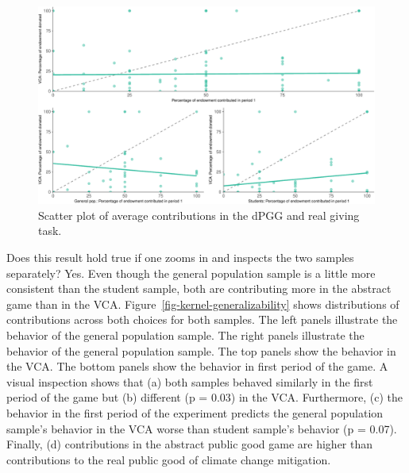 \documentclass[
  authoryear,
  preprint,
  3p]{elsarticle}
\begin{document}
\begin{figure}

{\centering \includegraphics{paper_files/figure-pdf/fig-scatter-generalizability-1.pdf}

}

\caption{\label{fig-scatter-generalizability}Scatter plot of average
contributions in the dPGG and real giving task.}

\end{figure}

Does this result hold true if one zooms in and inspects the two samples
separately? Yes. Even though the general population sample is a little
more consistent than the student sample, both are contributing more in
the abstract game than in the VCA.
Figure~\ref{fig-kernel-generalizability} shows distributions of
contributions across both choices for both samples. The left panels
illustrate the behavior of the general population sample. The right
panels illustrate the behavior of the general population sample. The top
panels show the behavior in the VCA. The bottom panels show the behavior
in first period of the game. A visual inspection shows that (a) both
samples behaved similarly in the first period of the game but (b)
different (p = 0.03) in the VCA. Furthermore, (c) the behavior in the
first period of the experiment predicts the general population sample's
behavior in the VCA worse than student sample's behavior (p = 0.07).
Finally, (d) contributions in the abstract public good game are higher
than contributions to the real public good of climate change mitigation.
\end{document}
